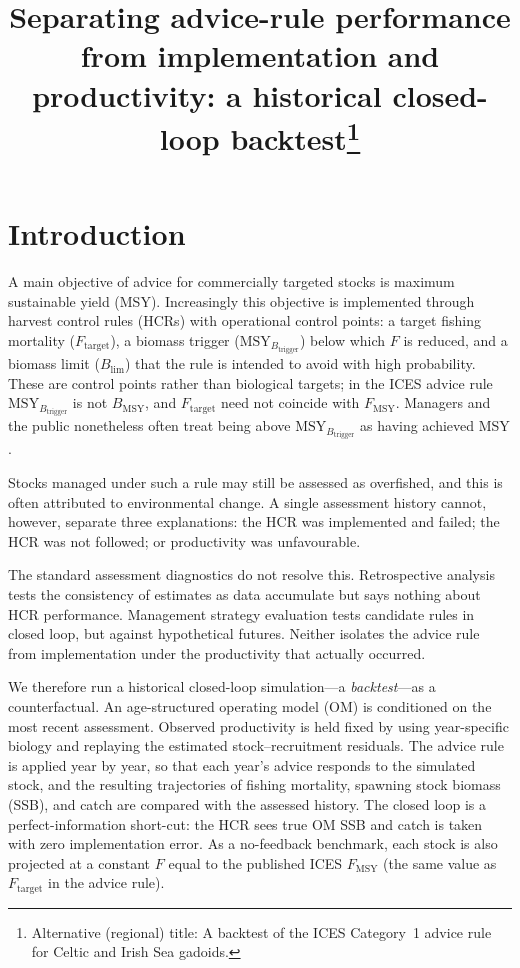 \documentclass[11pt,a4paper]{article}
\title{Separating advice-rule performance from implementation and
productivity: a historical closed-loop backtest\thanks{Alternative
(regional) title: A backtest of the ICES Category~1 advice rule for
Celtic and Irish Sea gadoids.}}
\author{}
\date{}
\newcommand{\Fmsy}{F_{\mathrm{MSY}}}
\newcommand{\Blim}{B_{\lim}}
\newcommand{\Btrig}{\mathrm{MSY}_{B_{\mathrm{trigger}}}}
\newcommand{\Bmsy}{B_{\mathrm{MSY}}}
\newcommand{\Ftar}{F_{\mathrm{target}}}
\begin{document}
\maketitle



\section{Introduction}
\label{sec:intro}

A main objective of advice for commercially targeted stocks is maximum
sustainable yield (MSY). Increasingly this objective is implemented
through harvest control rules (HCRs) with operational control points: a
target fishing mortality ($\Ftar$), a biomass trigger ($\Btrig$) below
which $F$ is reduced, and a biomass limit ($\Blim$) that the rule is
intended to avoid with high probability. These are control points rather
than biological targets; in the ICES advice rule $\Btrig$ is not $\Bmsy$,
and $\Ftar$ need not coincide with $\Fmsy$. Managers and the public
nonetheless often treat being above $\Btrig$ as having achieved MSY
\citep{winker2026rebuilding}.

Stocks managed under such a rule may still be assessed as overfished, and
this is often attributed to environmental change. A single assessment
history cannot, however, separate three explanations: the HCR was
implemented and failed; the HCR was not followed; or productivity was
unfavourable.

The standard assessment diagnostics do not resolve this. Retrospective
analysis tests the consistency of estimates as data accumulate
\citep{mohn1999} but says nothing about HCR performance. Management
strategy evaluation \citep[MSE;][]{punt2016msebestpractice} tests
candidate rules in closed loop, but against hypothetical futures.
Neither isolates the advice rule from implementation under the
productivity that actually occurred.

We therefore run a historical closed-loop simulation---a
\emph{backtest}---as a counterfactual. An age-structured operating model
(OM) is conditioned on the most recent assessment. Observed productivity
is held fixed by using year-specific biology and replaying the estimated
stock--recruitment residuals. The advice rule is applied year by year, so
that each year's advice responds to the simulated stock, and the
resulting trajectories of fishing mortality, spawning stock biomass
(SSB), and catch are compared with the assessed history. The closed loop
is a perfect-information short-cut: the HCR sees true OM SSB and catch
is taken with zero implementation error. As a no-feedback benchmark,
each stock is also projected at a constant $F$ equal to the published
ICES $F_{\mathrm{MSY}}$ (the same value as $\Ftar$ in the advice rule).
\end{document}
